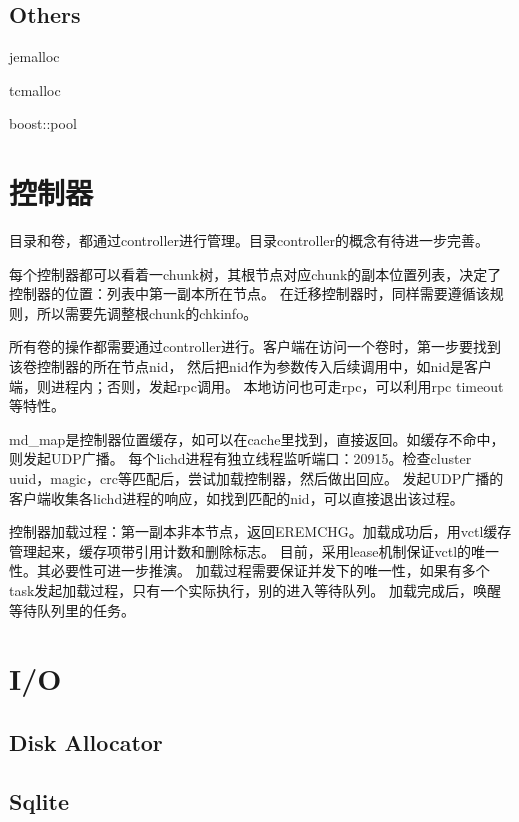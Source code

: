 \subsection{Others}

\begin{enumbox}
\item jemalloc
\item tcmalloc
\item boost::pool
\end{enumbox}

\section{控制器}

目录和卷，都通过controller进行管理。目录controller的概念有待进一步完善。

每个控制器都可以看着一chunk树，其根节点对应chunk的副本位置列表，决定了控制器的位置：列表中第一副本所在节点。
在迁移控制器时，同样需要遵循该规则，所以需要先调整根chunk的chkinfo。

所有卷的操作都需要通过controller进行。客户端在访问一个卷时，第一步要找到该卷控制器的所在节点nid，
然后把nid作为参数传入后续调用中，如nid是客户端，则进程内；否则，发起rpc调用。
本地访问也可走rpc，可以利用rpc timeout等特性。

md\_map是控制器位置缓存，如可以在cache里找到，直接返回。如缓存不命中，则发起UDP广播。
每个lichd进程有独立线程监听端口：20915。检查cluster uuid，magic，crc等匹配后，尝试加载控制器，然后做出回应。
发起UDP广播的客户端收集各lichd进程的响应，如找到匹配的nid，可以直接退出该过程。

控制器加载过程：第一副本非本节点，返回EREMCHG。加载成功后，用vctl缓存管理起来，缓存项带引用计数和删除标志。
目前，采用lease机制保证vctl的唯一性。其必要性可进一步推演。
加载过程需要保证并发下的唯一性，如果有多个task发起加载过程，只有一个实际执行，别的进入等待队列。
加载完成后，唤醒等待队列里的任务。

\section{I/O}

\subsection{Disk Allocator}

\subsection{Sqlite}

